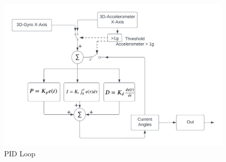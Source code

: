 \begin{figure}[H]
  \begin{center}
    \includegraphics[width=1\linewidth]{content/images/PID_Loop.png}
    \caption{PID Loop}
  \end{center}
\end{figure}